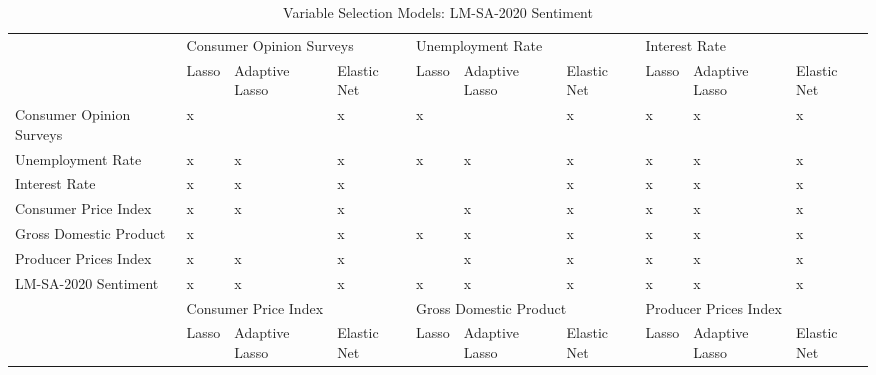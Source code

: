 \begin{landscape}


\begin{table}[]
\caption{Variable Selection Models: LM-SA-2020 Sentiment}
\label{tab:selectionlm}
\begin{adjustbox}{max width=\linewidth}
\begin{tabular}{llllllllll}
\hline
                         & \multicolumn{3}{l}{Consumer Opinion Surveys} & \multicolumn{3}{l}{Unemployment Rate}      & \multicolumn{3}{l}{Interest Rate}         \\
                         & Lasso    & Adaptive Lasso    & Elastic Net   & Lasso    & Adaptive Lasso   & Elastic Net  & Lasso   & Adaptive Lasso   & Elastic Net  \\
Consumer Opinion Surveys & x        &                   & x             & x        &                  & x            & x       & x                & x            \\
Unemployment Rate        & x        & x                 & x             & x        & x                & x            & x       & x                & x            \\
Interest Rate            & x        & x                 & x             &          &                  & x            & x       & x                & x            \\
Consumer Price Index     & x        & x                 & x             &          & x                & x            & x       & x                & x            \\
Gross Domestic Product   & x        &                   & x             & x        & x                & x            & x       & x                & x            \\
Producer Prices Index    & x        & x                 & x             &          & x                & x            & x       & x                & x            \\ \hline
LM-SA-2020 Sentiment          & x        & x                 & x             & x        & x                & x            & x       & x                & x            \\ \hline
                         & \multicolumn{3}{l}{Consumer Price Index}     & \multicolumn{3}{l}{Gross Domestic Product} & \multicolumn{3}{l}{Producer Prices Index} \\
                         & Lasso    & Adaptive Lasso    & Elastic Net   & Lasso    & Adaptive Lasso   & Elastic Net  & Lasso   & Adaptive Lasso   & Elastic Net  \\

\end{tabular}
\end{adjustbox}
\end{table}
\end{landscape}
